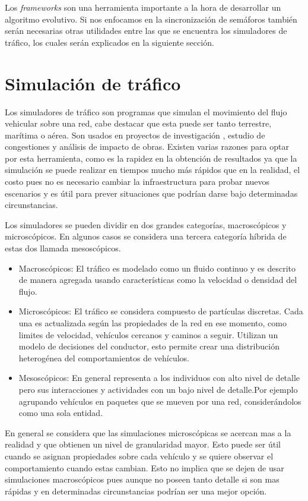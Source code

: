 Los \emph{frameworks} son una herramienta importante a la hora de desarrollar un algoritmo evolutivo. Si nos enfocamos en la sincronización de semáforos también serán necesarias otras utilidades entre las que se encuentra los simuladores de tráfico, los cuales serán explicados en la siguiente sección.


\section{Simulación de tráfico}

Los simuladores de tráfico son programas que simulan el movimiento del flujo vehicular sobre una red, cabe destacar que esta puede ser tanto terrestre, marítima o aérea. Son usados en proyectos de investigación , estudio de congestiones y análisis de impacto de obras.  Existen varias razones para optar por esta herramienta, como es la rapidez en la obtención de resultados ya que la simulación se puede realizar en tiempos mucho más rápidos que en la realidad, el costo pues no es necesario cambiar la infraestructura para probar nuevos escenarios y es útil para prever situaciones que podrían darse bajo determinadas circunstancias.

Los simuladores se pueden dividir en dos grandes categorías, macroscópicos y microscópicos. En algunos casos se considera una tercera categoría híbrida de estas dos llamada mesoscópicos.

\begin{itemize}
	\item Macroscópicos: El tráfico es modelado como un fluido continuo y es descrito de manera agregada usando características como la velocidad o densidad del flujo.
	\item Microscópicos: El tráfico se considera compuesto de partículas discretas. Cada una es actualizada según las propiedades de la red en ese momento, como limites de velocidad, vehículos cercanos y caminos a seguir. Utilizan un modelo de decisiones del conductor, esto permite crear una distribución heterogénea del comportamientos de vehículos.
	\item Mesoscópicos: En general representa a los individuos con alto nivel de detalle pero sus interacciones y actividades con un bajo nivel de detalle.Por ejemplo agrupando vehículos en paquetes que se mueven por una red, considerándolos como una sola entidad.
\end{itemize}

En general se considera que las simulaciones microscópicas se acercan mas a la realidad y que obtienen un nivel de granularidad mayor. Esto puede ser útil cuando se asignan propiedades sobre cada vehículo y se quiere observar el comportamiento cuando estas cambian. Esto no implica que se dejen de usar simulaciones macroscópicos pues aunque no poseen tanto detalle si son mas rápidas y en determinadas circunstancias podrían ser una mejor opción.


